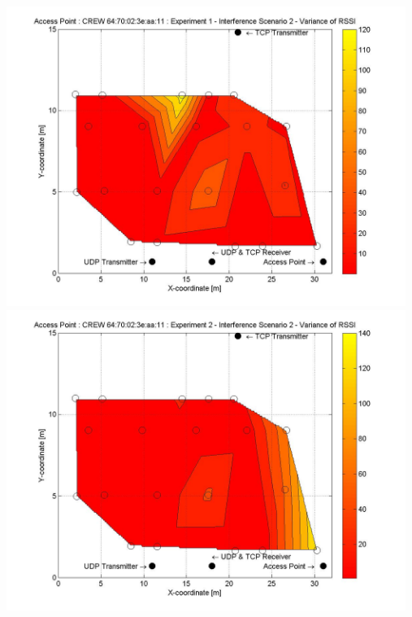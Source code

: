 \documentclass[11pt,a4paper,headinclude,footinclude,chapterprefix=on]{scrreprt}
\begin{document}
\begin{longtable}
	\includegraphics[width=13cm]{../../Source/plot/CREW_11/11_Wifi_Ex_1_Variance.jpg} \\
	\includegraphics[width=13cm]{../../Source/plot/CREW_11/11_Wifi_Ex_2_Variance.jpg} \\
\end{longtable}
\end{document}

